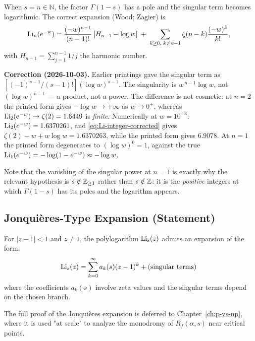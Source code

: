 \begin{remark}\label{rem:Li-integer}
When $s = n \in \mathbb{N}$, the factor $\Gamma(1-s)$ has a pole and the
singular term becomes logarithmic. The correct expansion (Wood; Zagier) is
\begin{equation}
\operatorname{Li}_n(e^{-w}) = \frac{(-w)^{n-1}}{(n-1)!}\left[H_{n-1} - \log w\right]
\;+\; \sum_{k \geq 0,\; k \neq n-1} \zeta(n-k)\frac{(-w)^k}{k!},
\label{eq:Li-integer-corrected}
\end{equation}
with $H_{n-1} = \sum_{j=1}^{n-1} 1/j$ the harmonic number.

\textbf{Correction (2026-10-03).} Earlier printings gave the singular term as
$[(-1)^{s-1}/(s-1)!](\log w)^{s-1}$. The singularity is
$w^{\,n-1}\log w$, not $(\log w)^{n-1}$ --- a product, not a power. The
difference is not cosmetic: at $n = 2$ the printed form gives
$-\log w \to +\infty$ as $w \to 0^+$, whereas
$\operatorname{Li}_2(e^{-w}) \to \zeta(2) = 1.6449$ is \emph{finite}. Numerically at
$w = 10^{-3}$: $\operatorname{Li}_2(e^{-w}) = 1.6370261$, and
\eqref{eq:Li-integer-corrected} gives $\zeta(2) - w + w\log w = 1.6370263$,
while the printed form gives $6.9078$. At $n = 1$ the printed form degenerates to
$(\log w)^0 = 1$, against the true
$\operatorname{Li}_1(e^{-w}) = -\log(1 - e^{-w}) \approx -\log w$.

Note that the vanishing of the singular power at $n = 1$ is exactly why the
relevant hypothesis is $s \notin \mathbb{Z}_{\geq 1}$ rather than $s \notin \mathbb{Z}$: it is
the \emph{positive} integers at which $\Gamma(1-s)$ has its poles and the
logarithm appears.
\end{remark}

\subsection{Jonquières-Type Expansion (Statement)}

\begin{theorem}\label{thm:jonquieres}
For $|z-1| < 1$ and $z \neq 1$, the polylogarithm $\operatorname{Li}_s(z)$ admits an expansion of the form:
\begin{equation}
\operatorname{Li}_s(z) = \sum_{k=0}^{\infty} a_k(s) (z-1)^k + \text{(singular terms)}
\end{equation}
where the coefficients $a_k(s)$ involve zeta values and the singular terms depend on the chosen branch.
\end{theorem}

\begin{remark}
The full proof of the Jonquières expansion is deferred to Chapter~\ref{ch:p-vs-np}, where it is used "at scale" to analyze the monodromy of $R_f(\alpha, s)$ near critical points.
\end{remark}

